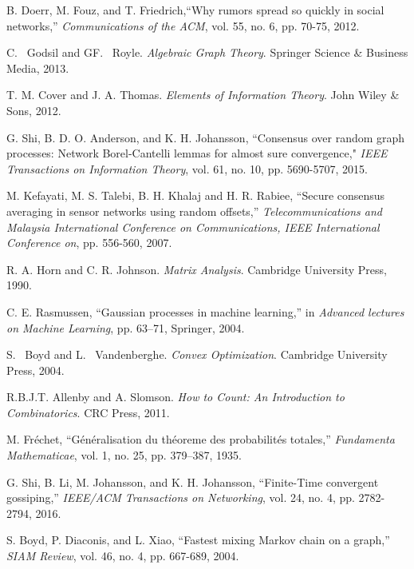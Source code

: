 \documentclass[a4paper, 11pt]{article}
\newcommand{\1}{\mathbf{1}}
\begin{document}
\begin{thebibliography}{1}
B. Doerr, M. Fouz, and T. Friedrich,``Why rumors spread so quickly
in social networks,'' {\em Communications of the ACM}, vol. 55, no. 6, pp. 70-75, 2012.

C. ~Godsil and GF. ~Royle. {\em {A}lgebraic {G}raph {T}heory}.
\newblock Springer Science \& Business Media, 2013.

T. M. Cover and J. A. Thomas. {\em {E}lements of {I}nformation {T}heory}.
\newblock John Wiley \& Sons, 2012.

 G. Shi, B. D. O. Anderson, and K. H. Johansson, ``Consensus over random graph processes: Network Borel-Cantelli lemmas for almost sure convergence," {\em IEEE Transactions on Information Theory}, vol. 61, no. 10, pp. 5690-5707, 2015.

 M. Kefayati, M. S. Talebi, B. H. Khalaj and H. R. Rabiee, ``Secure consensus averaging in sensor networks using random offsets,'' {\em Telecommunications and Malaysia International Conference on Communications, IEEE International Conference on}, pp. 556-560, 2007.

R. A. Horn and C. R. Johnson. {\em Matrix {A}nalysis}.
\newblock Cambridge University Press, 1990.

C. E. Rasmussen, ``Gaussian processes in machine learning,'' in {\em Advanced
	lectures on Machine Learning}, pp. 63--71, Springer, 2004.

S. ~Boyd and L. ~Vandenberghe. {\em {C}onvex {O}ptimization}.
\newblock Cambridge University Press, 2004.

R.B.J.T. Allenby  and A. Slomson. {\em {H}ow to {C}ount: {A}n {I}ntroduction to {C}ombinatorics}.
\newblock CRC Press, 2011.

M. Fr{\'e}chet, ``G{\'e}n{\'e}ralisation du th{\'e}oreme des probabilit{\'e}s
totales,'' {\em Fundamenta Mathematicae}, vol. 1, no. 25, pp. 379--387, 1935.

 G. Shi, B. Li, M. Johansson, and K. H. Johansson, ``Finite-Time convergent gossiping,'' {\em  IEEE/ACM Transactions on Networking}, vol. 24, no. 4, pp. 2782-2794, 2016.


S. Boyd, P. Diaconis, and L. Xiao, ``Fastest mixing Markov chain on a
graph,'' {\em SIAM Review}, vol. 46, no. 4, pp. 667-689, 2004.
\end{thebibliography}
\end{document}
